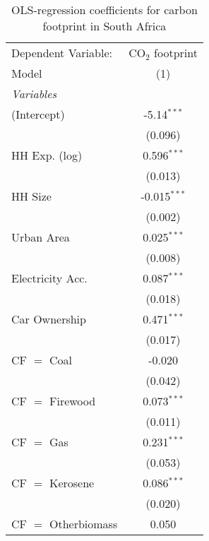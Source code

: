 
\begin{table}[htbp!]
   \centering
   \small
   \begin{adjustbox}{width = 1\textwidth, max height = 0.95\textheight, center}
      \begin{threeparttable}[b]
         \caption{\label{tab:OLS_2_ZAF} OLS-regression coefficients for carbon footprint in South Africa}
         \begin{tabular}{lc}
            \tabularnewline \midrule \midrule
            Dependent Variable: & CO$_{2}$ footprint\\  
            Model               & (1)\\  
            \midrule
            \emph{Variables}\\
            (Intercept)         & -5.14$^{***}$\\   
                                & (0.096)\\   
            HH Exp. (log)       & 0.596$^{***}$\\   
                                & (0.013)\\   
            HH Size             & -0.015$^{***}$\\   
                                & (0.002)\\   
            Urban Area          & 0.025$^{***}$\\   
                                & (0.008)\\   
            Electricity Acc.    & 0.087$^{***}$\\   
                                & (0.018)\\   
            Car Ownership       & 0.471$^{***}$\\   
                                & (0.017)\\   
            CF $=$ Coal         & -0.020\\   
                                & (0.042)\\   
            CF $=$ Firewood     & 0.073$^{***}$\\   
                                & (0.011)\\   
            CF $=$ Gas          & 0.231$^{***}$\\   
                                & (0.053)\\   
            CF $=$ Kerosene     & 0.086$^{***}$\\   
                                & (0.020)\\   
            CF $=$ Otherbiomass & 0.050\\   

\end{tabular}
\end{threeparttable}
\end{adjustbox}
\end{table}
